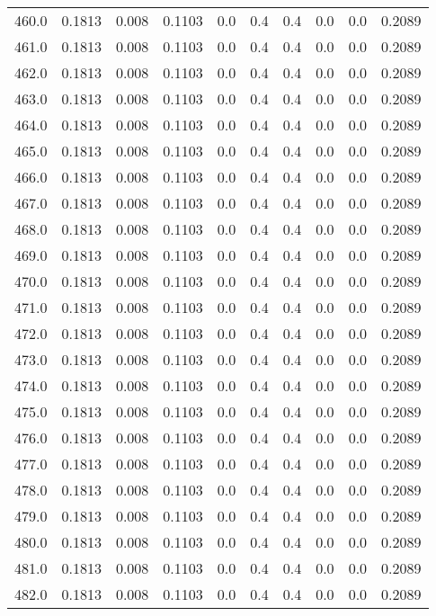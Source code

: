 \begin{longtable}{lrrrrrrrrr}
460.0 & 0.1813 & 0.008 & 0.1103 & 0.0 & 0.4 & 0.4 & 0.0 & 0.0 & 0.2089 \\
461.0 & 0.1813 & 0.008 & 0.1103 & 0.0 & 0.4 & 0.4 & 0.0 & 0.0 & 0.2089 \\
462.0 & 0.1813 & 0.008 & 0.1103 & 0.0 & 0.4 & 0.4 & 0.0 & 0.0 & 0.2089 \\
463.0 & 0.1813 & 0.008 & 0.1103 & 0.0 & 0.4 & 0.4 & 0.0 & 0.0 & 0.2089 \\
464.0 & 0.1813 & 0.008 & 0.1103 & 0.0 & 0.4 & 0.4 & 0.0 & 0.0 & 0.2089 \\
465.0 & 0.1813 & 0.008 & 0.1103 & 0.0 & 0.4 & 0.4 & 0.0 & 0.0 & 0.2089 \\
466.0 & 0.1813 & 0.008 & 0.1103 & 0.0 & 0.4 & 0.4 & 0.0 & 0.0 & 0.2089 \\
467.0 & 0.1813 & 0.008 & 0.1103 & 0.0 & 0.4 & 0.4 & 0.0 & 0.0 & 0.2089 \\
468.0 & 0.1813 & 0.008 & 0.1103 & 0.0 & 0.4 & 0.4 & 0.0 & 0.0 & 0.2089 \\
469.0 & 0.1813 & 0.008 & 0.1103 & 0.0 & 0.4 & 0.4 & 0.0 & 0.0 & 0.2089 \\
470.0 & 0.1813 & 0.008 & 0.1103 & 0.0 & 0.4 & 0.4 & 0.0 & 0.0 & 0.2089 \\
471.0 & 0.1813 & 0.008 & 0.1103 & 0.0 & 0.4 & 0.4 & 0.0 & 0.0 & 0.2089 \\
472.0 & 0.1813 & 0.008 & 0.1103 & 0.0 & 0.4 & 0.4 & 0.0 & 0.0 & 0.2089 \\
473.0 & 0.1813 & 0.008 & 0.1103 & 0.0 & 0.4 & 0.4 & 0.0 & 0.0 & 0.2089 \\
474.0 & 0.1813 & 0.008 & 0.1103 & 0.0 & 0.4 & 0.4 & 0.0 & 0.0 & 0.2089 \\
475.0 & 0.1813 & 0.008 & 0.1103 & 0.0 & 0.4 & 0.4 & 0.0 & 0.0 & 0.2089 \\
476.0 & 0.1813 & 0.008 & 0.1103 & 0.0 & 0.4 & 0.4 & 0.0 & 0.0 & 0.2089 \\
477.0 & 0.1813 & 0.008 & 0.1103 & 0.0 & 0.4 & 0.4 & 0.0 & 0.0 & 0.2089 \\
478.0 & 0.1813 & 0.008 & 0.1103 & 0.0 & 0.4 & 0.4 & 0.0 & 0.0 & 0.2089 \\
479.0 & 0.1813 & 0.008 & 0.1103 & 0.0 & 0.4 & 0.4 & 0.0 & 0.0 & 0.2089 \\
480.0 & 0.1813 & 0.008 & 0.1103 & 0.0 & 0.4 & 0.4 & 0.0 & 0.0 & 0.2089 \\
481.0 & 0.1813 & 0.008 & 0.1103 & 0.0 & 0.4 & 0.4 & 0.0 & 0.0 & 0.2089 \\
482.0 & 0.1813 & 0.008 & 0.1103 & 0.0 & 0.4 & 0.4 & 0.0 & 0.0 & 0.2089 \\

\end{longtable}
